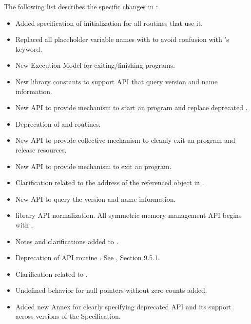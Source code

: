 The following list describes the specific changes in \openshmem[1.2]:
\begin{itemize}
%
\item Added specification of  initialization for all routines that use it.
%
\item Replaced all placeholder variable names  with  to
      avoid confusion with \Fortran's  keyword.
%
\item New Execution Model for exiting/finishing \openshmem programs.
%
%
\item New library constants to support \ac{API} that query version and name information.
%
%
\item New \ac{API}  to provide mechanism to start an \openshmem
      program and replace deprecated .
%
%
\item Deprecation of  and  routines.
%
%
\item New \ac{API}  to provide collective mechanism to cleanly
      exit an \openshmem program and release resources.
%
%
\item New \ac{API}  to provide mechanism to exit an
    \openshmem program.
%
%
\item Clarification related to the address of the referenced object in
    .
%
%
\item New \ac{API} to query the version and name information.
%
%
\item \openshmem library \ac{API} normalization. All \Cstd symmetric memory management
      \ac{API} begins with .
%
%
\item Notes and clarifications added to .
%
%
\item Deprecation of \Fortran \ac{API} routine .
%
See \openshmem[1.4], Section 9.5.1.
%
\item Clarification related to .
%
%
\item Undefined behavior for null pointers without zero counts added.
%
%
\item Added new Annex for clearly specifying deprecated \ac{API} and its
      support across versions of the \openshmem Specification.
%
%
\end{itemize}




